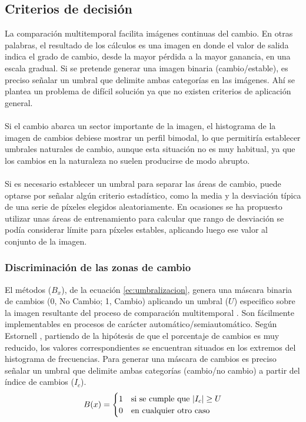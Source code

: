 \subsection{Criterios de decisi\'on}
La comparaci\'on multitemporal facilita im\'agenes continuas del cambio. En otras palabras, el resultado de los c\'alculos es una imagen en donde el valor de salida indica el grado de cambio, desde la mayor p\'erdida a la mayor ganancia, en una escala gradual. Si se pretende generar una imagen binaria (cambio/estable), es preciso se\~{n}alar un umbral que delimite ambas categor\'ias en las im\'agenes. Ah\'i se plantea un problema de dif\'icil soluci\'on ya que no existen criterios de aplicación general.\\~\\
Si el cambio abarca un sector importante de la imagen, el histograma de la imagen de cambios debiese mostrar un perfil bimodal, lo que permitir\'ia establecer umbrales naturales de cambio, aunque esta situaci\'on no es muy habitual, ya que los cambios en la naturaleza no suelen producirse de modo abrupto\cite{martinez2013normalizacion}.\\~\\
Si es necesario establecer un umbral para separar las \'areas de cambio, puede optarse por se\~{n}alar alg\'un criterio estad\'istico, como la media y la desviaci\'on t\'ipica de una serie de p\'ixeles elegidos aleatoriamente. En ocasiones se ha propuesto utilizar unas \'areas de entrenamiento para calcular que rango de desviaci\'on se pod\'ia considerar l\'imite para p\'ixeles estables, aplicando luego ese valor al conjunto de la imagen\cite{tung1988determination}.

\subsubsection{Discriminaci\'on de las zonas de cambio}\label{sec:discriminacion}
El m\'etodos ($ B_{x} $), de la ecuaci\'on \ref{ec:umbralizacion}, genera una m\'ascara binaria de cambios (0, No Cambio; 1, Cambio) aplicando un umbral ($ U $) especifico sobre la imagen resultante del proceso de comparaci\'on multitemporal \cite{singh1989review}. Son f\'acilmente implementables en procesos de car\'acter autom\'atico/semiautom\'atico. Según Estornell \cite{estornell2004analisis}, partiendo de la hip\'otesis de que el porcentaje de cambios es muy reducido, los valores correspondientes se encuentran situados en los extremos del histograma de frecuencias. Para generar una m\'ascara de cambios es preciso se\~{n}alar un umbral que delimite ambas categorías (cambio/no cambio) a partir del \'indice de cambios ($ I_{c} $)\cite{radke2005image}.	
\begin{equation}\label{ec:umbralizacion}
B(x) = \begin{cases}
1 & \text{si se cumple que } \abs{I_c} \geq U \\
0 & \text{en cualquier otro caso}
\end{cases}
\end{equation}

